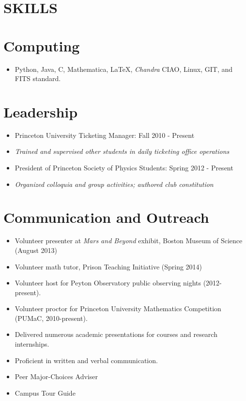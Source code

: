 \documentclass[margin]{res}
\begin{document}
\begin{resume}
\section{SKILLS}
\normalsize{\section{Computing}}
                 \begin{itemize}
                 \item Python, Java, C, Mathematica, \LaTeX,
                   \textit{Chandra} CIAO, Linux, GIT, and FITS
                   standard.
                 \end{itemize}
\normalsize{\section{Leadership}}
	           \begin{itemize} 
                   \item Princeton University Ticketing Manager: Fall
                     2010 - Present
                    \item[] \textit{Trained and supervised other
                      students in daily ticketing office operations}
                   \item President of Princeton Society of Physics
                     Students: Spring 2012 - Present
                   	\item[] \textit{Organized colloquia and group
                          activities; authored club constitution}
                   \end{itemize}
\normalsize{\section{Communication and Outreach}}
                  \begin{itemize}
                  \item Volunteer presenter at \textit{Mars and
                    Beyond} exhibit, Boston Museum of Science (August
                    2013)
                    \item Volunteer math tutor, Prison Teaching
                      Initiative (Spring 2014)
                  \item Volunteer host for Peyton Observatory public
                    observing nights (2012-present).
                  \item Volunteer proctor for Princeton University
                    Mathematics Competition (PUMaC, 2010-present).
                  \item Delivered numerous academic presentations for
                    courses and research internships.
                  \item Proficient in written and verbal
                    communication.
                  \item Peer Major-Choices Adviser
                  \item Campus Tour Guide
                  \end{itemize} 
\end{resume} 
\end{document}
